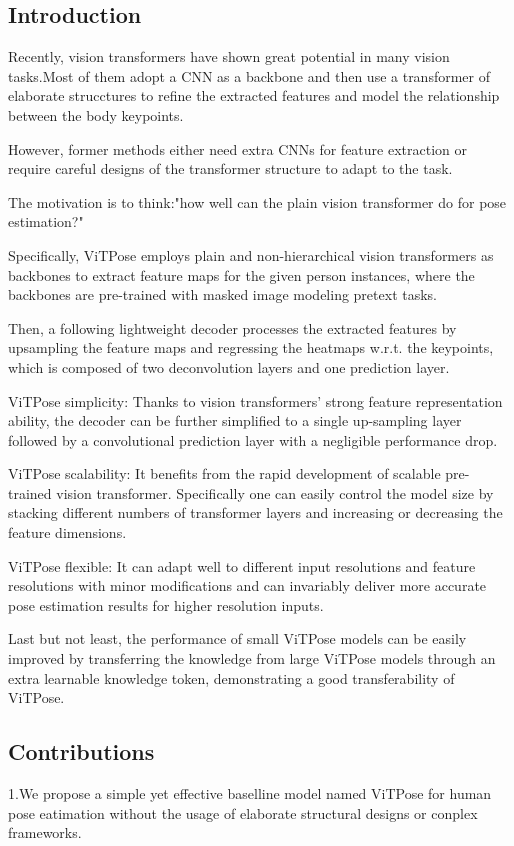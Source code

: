 \documentclass[11pt]{article}
\begin{document}
\subsection{Introduction}
Recently, vision transformers have shown great potential in many vision tasks.Most of them adopt a CNN as a backbone and then use a transformer of elaborate strucctures to refine the extracted features and model the relationship between the body keypoints.

However, former methods either need extra CNNs for feature extraction or require careful designs of the transformer structure to adapt to the task.

The motivation is to think:"how well can the plain vision transformer do for pose estimation?"

Specifically, ViTPose employs plain and non-hierarchical vision transformers as backbones to extract feature maps for the given person instances, where the backbones are pre-trained with masked image modeling pretext tasks.

Then, a following lightweight decoder processes the extracted features by upsampling the feature maps and regressing the heatmaps w.r.t. the keypoints, which is composed of two deconvolution layers and one prediction layer.

ViTPose simplicity: Thanks to vision transformers' strong feature representation ability, the decoder can be further simplified to a single up-sampling layer followed by a convolutional prediction layer with a negligible performance drop.

ViTPose scalability: It benefits from the rapid development of scalable pre-trained vision transformer. Specifically one can easily control the model size by stacking different numbers of transformer layers and increasing or decreasing the feature dimensions.

ViTPose flexible: It can adapt well to different input resolutions and feature resolutions with minor modifications and can invariably deliver more accurate pose estimation results for higher resolution inputs.

Last but not least, the performance of small ViTPose models can be easily improved by transferring the knowledge from large ViTPose models through an extra learnable knowledge token, demonstrating a good transferability of ViTPose.

\subsection{Contributions}
1.We propose a simple yet effective baselline model named ViTPose for human pose eatimation without the usage of elaborate structural designs or conplex frameworks.
\end{document}
